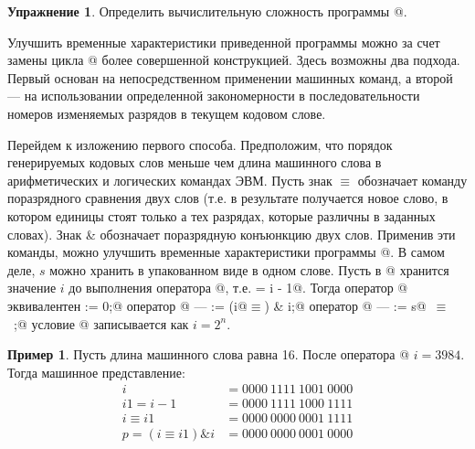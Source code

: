 \documentclass[12pt,a4paper]{article}
\theoremstyle{plain}
\theoremstyle{definition}
\newtheorem*{task}{Упражнение}
\newtheorem*{example}{Пример}
\theoremstyle{remark}
\newtheorem*{comment}{Комментарий}
\begin{document}
\begin{comment}
Пусть после выполнения оператора \verb@{1}@ $i$ имеет двоичное разложение $b_m\ldots b_p0\ldots 0$, где $b_p=1$ (или до выполнения оператора \verb@{1}@ значение i в двоичной системе выглядело как $b_m\ldots b_{p+1}01\ldots1$ (сравните с программой \verb@SET1@)). Для определения $p$ достаточно выполнить оператор \verb@{2}@. Условие \verb@{4}@ означает, что уже сгенерировано $2^n$ кодовых слов.
\end{comment}

\begin{task}
Определить вычислительную сложность программы @.
\end{task}

Улучшить временные характеристики приведенной программы можно за счет замены цикла @ более совершенной конструкцией. Здесь возможны два подхода. Первый основан на непосредственном применении машинных команд, а второй --- на использовании определенной закономерности в последовательности номеров изменяемых разрядов в текущем кодовом слове.

Перейдем к изложению первого способа. Предположим, что порядок генерируемых кодовых слов меньше чем длина машинного слова в арифметических и логических командах ЭВМ. Пусть знак $\equiv$ обозначает команду поразрядного сравнения двух слов (т.е. в результате получается новое слово, в котором единицы стоят только а тех разрядах, которые различны в заданных словах). Знак \& обозначает поразрядную конъюнкцию двух слов. Применив эти команды, можно улучшить временные характеристики программы @. В самом деле, $s$ можно хранить в упакованном виде в одном слове. Пусть в @ хранится значение $i$ до выполнения оператора @, т.е.  = i - 1@. Тогда оператор @ эквивалентен \verb@s := 0;@ оператор @ --- \verb@p := (i@$\equiv$) & i;@ оператор @ --- \verb@s := s@~$\equiv$~\verb@p;@ условие @ записывается как $i = 2^n$.

\begin{example}
Пусть длина машинного слова равна 16. После оператора @ $i=3984$. Тогда машинное представление:
\[
\begin{aligned}
i &= 0000\: 1111\: 1001\: 0000 \\
i1 = i-1 &= 0000\: 1111\: 1000\: 1111 \\
i \equiv i1 &= 0000\: 0000\: 0001\: 1111 \\
p=(i \equiv i1) \& i &= 0000\: 0000\: 0001\: 0000
\end{aligned}
\]
\end{example}
\end{document}
